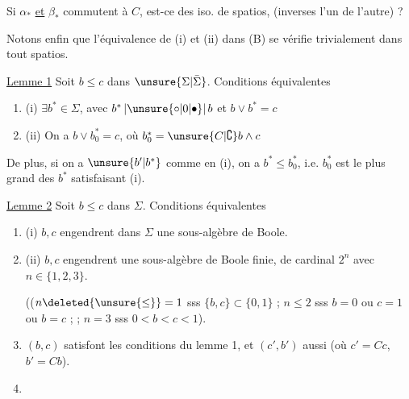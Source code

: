  Si $\alpha_*$ \uline{et} $\beta_*$ commutent à $C$, est-ce des iso. de spatios,  (inverses l'un de l'autre) ?

Notons enfin que l'équivalence de (i) et (ii) dans (B) se vérifie trivialement dans tout spatios.


\uline{Lemme 1} Soit $b\leq c$ dans $\unsure{\Sigma|\bar\Sigma}$. Conditions équivalentes
\begin{enumerate}[label={},leftmargin=1.8em]
\item (i) $\exists b^*\in\Sigma$, avec $b^*\,|\unsure{\circ|0|\bullet}|\,b$ et $b\vee b^*=c$
\item (ii) On a $b\vee b_0^*=c$, où $b_0^*=\unsure{C|\complement}b\wedge c$
\end{enumerate}
De plus, si on a $\unsure{b'|b^*}$ comme en (i), on a $b^*\leq b_0^*$, i.e. $b_0^*$ est le plus grand des $b^*$ satisfaisant (i).

\uline{Lemme 2} Soit $b\leq c$ dans $\Sigma$. Conditions équivalentes
\begin{enumerate}[label={},leftmargin=1.8em]
\item (i) $b,c$ engendrent dans $\Sigma$  une sous-algèbre de Boole.
\item (ii) $b,c$ engendrent une sous-algèbre de Boole finie, de cardinal $2^n$ avec $n\in\{1,2,3\}$.

 (($n\deleted{\unsure{\leq}}=1$ sss $\{b,c\}\subset\{0,1\}$ ; $n\leq2$ sss $b=0$ ou $c=1$ ou $b=c$ ;    ; $n=3$ sss $0<b<c<1$).
\item {} $(b,c)$ satisfont les conditions du lemme 1, et $(c',b')$ aussi (où $c'=Cc$, $b'=Cb$).
\item {}
\end{enumerate}

